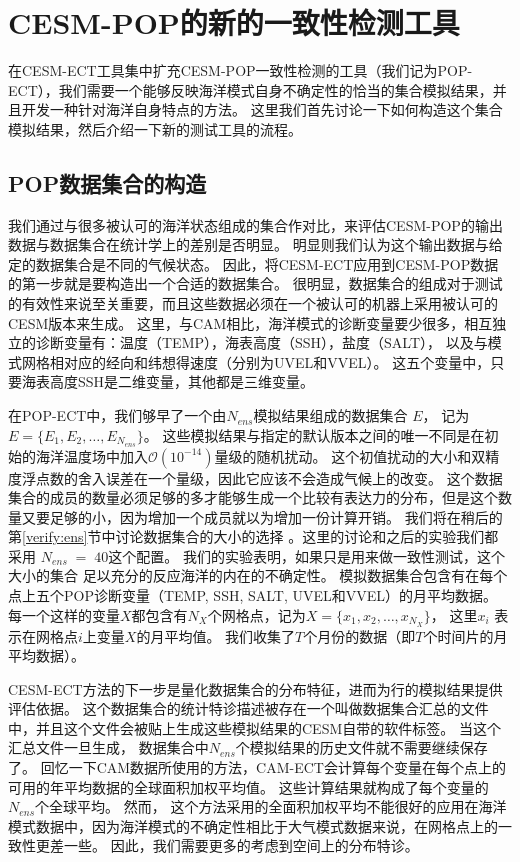 \section{CESM-POP的新的一致性检测工具}\label{verify:ECT}

 
在CESM-ECT工具集中扩充CESM-POP一致性检测的工具（我们记为POP-ECT），我们需要一个能够反映海洋模式自身不确定性的恰当的集合模拟结果，并且开发一种针对海洋自身特点的方法。
这里我们首先讨论一下如何构造这个集合模拟结果，然后介绍一下新的测试工具的流程。 
\subsection{POP数据集合的构造}\label{verify:createEns}

 
我们通过与很多被认可的海洋状态组成的集合作对比，来评估CESM-POP的输出数据与数据集合在统计学上的差别是否明显。
明显则我们认为这个输出数据与给定的数据集合是不同的气候状态。 
因此，将CESM-ECT应用到CESM-POP数据的第一步就是要构造出一个合适的数据集合。 
很明显，数据集合的组成对于测试的有效性来说至关重要，而且这些数据必须在一个被认可的机器上采用被认可的CESM版本来生成。
这里，与CAM相比，海洋模式的诊断变量要少很多，相互独立的诊断变量有：温度（TEMP），海表高度（SSH），盐度（SALT）， 以及与模式网格相对应的经向和纬想得速度（分别为UVEL和VVEL）。
这五个变量中，只要海表高度SSH是二维变量，其他都是三维变量。 

 
在POP-ECT中，我们够早了一个由$N_{ens}$模拟结果组成的数据集合 $E$， 记为 $E =\{E_1, E_2, \dots, E_{N_{ens}} \}$。
这些模拟结果与指定的默认版本之间的唯一不同是在初始的海洋温度场中加入$\mathcal{O}(10^{-14})$量级的随机扰动。 
这个初值扰动的大小和双精度浮点数的舍入误差在一个量级，因此它应该不会造成气候上的改变。
这个数据集合的成员的数量必须足够的多才能够生成一个比较有表达力的分布，但是这个数量又要足够的小，因为增加一个成员就以为增加一份计算开销。 
我们将在稍后的第\ref{verify:ens}节中讨论数据集合的大小的选择 。这里的讨论和之后的实验我们都采用 $N_{ens} \;=\; 40$这个配置。
我们的实验表明，如果只是用来做一致性测试，这个大小的集合 足以充分的反应海洋的内在的不确定性。
模拟数据集合包含有在每个点上五个POP诊断变量（TEMP, SSH, SALT, UVEL和VVEL）的月平均数据。
每一个这样的变量$X$都包含有$N_X$个网格点，记为${X} = \{ x_1, x_2, \dots, x_{N_X}\}$， 这里$x_i$ 表示在网格点$i$上变量$X$的月平均值。
我们收集了$T$个月份的数据（即$T$个时间片的月平均数据）。

 
CESM-ECT方法的下一步是量化数据集合的分布特征，进而为行的模拟结果提供评估依据。
这个数据集合的统计特诊描述被存在一个叫做数据集合汇总的文件中，并且这个文件会被贴上生成这些模拟结果的CESM自带的软件标签。
当这个汇总文件一旦生成， 数据集合中$N_{ens}$个模拟结果的历史文件就不需要继续保存了。 
回忆一下CAM数据所使用的方法，CAM-ECT会计算每个变量在每个点上的可用的年平均数据的全球面积加权平均值。
这些计算结果就构成了每个变量的$N_{ens}$个全球平均。 
然而， 这个方法采用的全面积加权平均不能很好的应用在海洋模式数据中，因为海洋模式的不确定性相比于大气模式数据来说，在网格点上的一致性更差一些。
因此，我们需要更多的考虑到空间上的分布特诊。 

